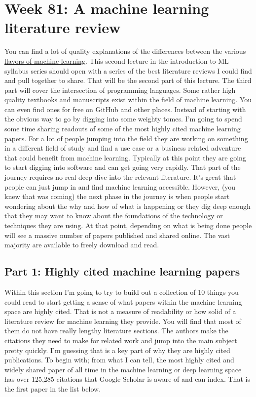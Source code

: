 \documentclass{article}
\begin{document}
\section{Week 81: A machine learning literature review}
You can find a lot of quality explanations of the differences between the various \href{https://www.ibm.com/cloud/blog/ai-vs-machine-learning-vs-deep-learning-vs-neural-networks}{flavors of machine learning}. This second lecture in the introduction to ML syllabus series should open with a series of the best literature reviews I could find and pull together to share. That will be the second part of this lecture. The third part will cover the intersection of programming languages. Some rather high quality textbooks and manuscripts exist within the field of machine learning. You can even find ones for free on GitHub and other places. Instead of starting with the obvious way to go by digging into some weighty tomes. I’m going to spend some time sharing readouts of some of the most highly cited machine learning papers. For a lot of people jumping into the field they are working on something in a different field of study and find a use case or a business related adventure that could benefit from machine learning. Typically at this point they are going to start digging into software and can get going very rapidly. That part of the journey requires no real deep dive into the relevant literature. It’s great that people can just jump in and find machine learning accessible. However, (you knew that was coming) the next phase in the journey is when people start wondering about the why and how of what is happening or they dig deep enough that they may want to know about the foundations of the technology or techniques they are using. At that point, depending on what is being done people will see a massive number of papers published and shared online. The vast majority are available to freely download and read. 
\subsection{Part 1: Highly cited machine learning papers}
Within this section I’m going to try to build out a collection of 10 things you could read to start getting a sense of what papers within the machine learning space are highly cited. That is not a measure of readability or how solid of a literature review for machine learning they provide. You will find that most of them do not have really lengthy literature sections. The authors make the citations they need to make for related work and jump into the main subject pretty quickly. I’m guessing that is a key part of why they are highly cited publications. To begin with; from what I can tell, the most highly cited and widely shared paper of all time in the machine learning or deep learning space has over 125,285 citations that Google Scholar is aware of and can index. That is the first paper in the list below.
\end{document}
